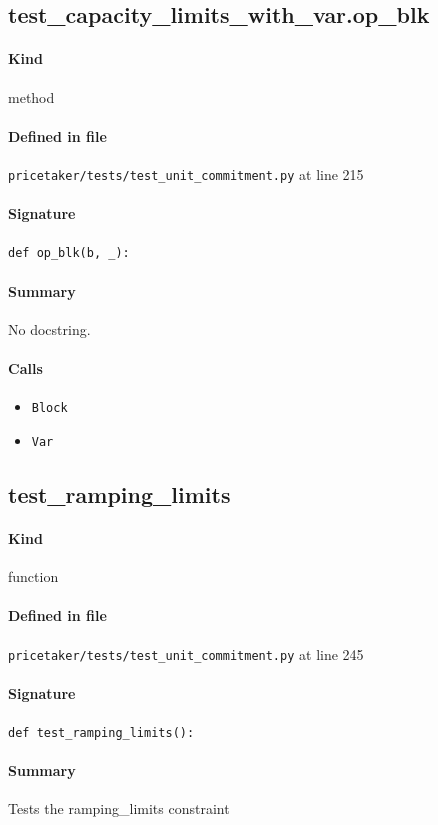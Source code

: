 \documentclass[11pt]{report}
\begin{document}
\subsection{test\_capacity\_limits\_with\_var.op\_blk}
\label{def:pricetaker-tests-test_unit_commitment.py:test_capacity_limits_with_var.op_blk:L215}
\paragraph{Kind} method
\paragraph{Defined in file} \texttt{pricetaker/tests/test\_unit\_commitment.py} at line 215
\paragraph{Signature} \texttt{def op\_blk(b, \_):}
\paragraph{Summary} No docstring.
\paragraph{Calls}
\begin{itemize}[leftmargin=*]
  \item \texttt{Block}
  \item \texttt{Var}
\end{itemize}
\subsection{test\_ramping\_limits}
\label{def:pricetaker-tests-test_unit_commitment.py:test_ramping_limits:L245}
\paragraph{Kind} function
\paragraph{Defined in file} \texttt{pricetaker/tests/test\_unit\_commitment.py} at line 245
\paragraph{Signature} \texttt{def test\_ramping\_limits():}
\paragraph{Summary} Tests the ramping\_limits constraint
\end{document}
